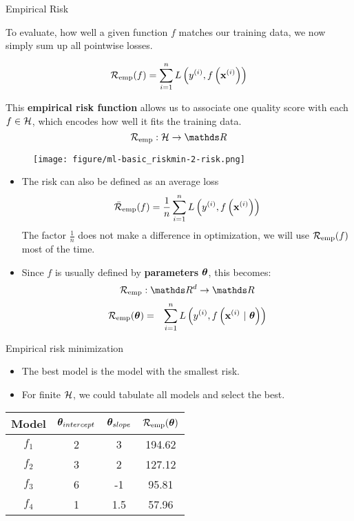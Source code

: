 \documentclass[11pt,compress,t,notes=noshow, xcolor=table]{beamer}
\begin{document}
\begin{vbframe}{Empirical Risk}

To evaluate, how well a given function $f$ matches our training data,
we now simply sum up all pointwise losses.
  
$$ \mathcal{R}_{\text{emp}}(f) = \sum\limits_{i=1}^n L\left(y^{(i)}, f\left(\mathbf{x}^{(i)}\right)\right) $$

This \textbf{empirical risk function} allows us
to associate one quality score with each $f \in \mathcal{H}$,
which encodes how well it fits the training data.
$$ \riske:  \Hspace \to \R $$  
\begin{center}
\begin{figure}[!b]
\texttt{[image: figure/ml-basic\_riskmin-2-risk.png]}
\end{figure}
\end{center}

\framebreak 
   
\begin{itemize}
\item The risk can also be defined as an average loss
  $$
    \bar{\mathcal{R}}_{\text{emp}}(f) = \frac{1}{n}\sum\limits_{i=1}^n L\left(y^{(i)}, f\left(\mathbf{x}^{(i)}\right)\right)
  $$
  The factor $\frac{1}{n}$ does not make a difference in optimization, we will use $\mathcal{R}_{\text{emp}}(f)$ most of the time.  
\item Since $f$ is usually defined by \textbf{parameters} $\bm{\theta}$, this becomes:
$$\riske : \R^d \to \R$$
\begin{eqnarray*}
\mathcal{R}_{\text{emp}}(\bm{\theta}) & = & \sum\limits_{i=1}^n L\left(y^{(i)}, f\left(\mathbf{x}^{(i)} ~|~ \bm{\theta}\right)\right) \cr
\end{eqnarray*}
 

\end{itemize}
   
   
\end{vbframe}




\begin{vbframe}{Empirical risk minimization}

\begin{itemize}
    \item The best model is the model with the smallest risk.
    \item For finite $\mathcal{H}$, we could tabulate all models
and select the best.
\end{itemize}

\lz

\begin{center}
\begin{tabular}{ c | c | c || c }
 Model & \(\displaystyle \bm{\theta}_{intercept} \) & \(\displaystyle \bm{\theta}_{slope} \) & \(\displaystyle \mathcal{R}_{\text{emp}}(\bm{\theta}) \) \\ 
 \hline
\(\displaystyle f_1 \)   & 2 & 3 & 194.62 \\
\(\displaystyle f_2 \)   & 3 & 2 & 127.12 \\  
\(\displaystyle f_3 \)   & 6 & -1 & 95.81 \\
\rowcolor{lightgray}
\(\displaystyle f_4 \)   & 1 & 1.5 & 57.96 \\  
\end{tabular}
\end{center}


\end{vbframe}
\end{document}
